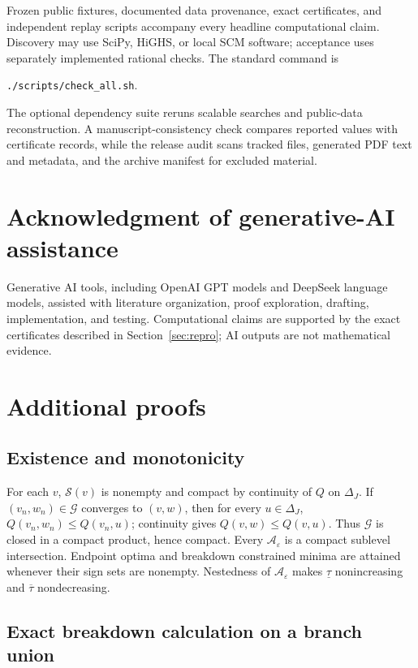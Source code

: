 \documentclass[10pt]{article}
\theoremstyle{definition}
\newcommand{\DeltaJ}{\Delta_J}
\newcommand{\cG}{\mathcal G}
\newcommand{\cA}{\mathcal A}
\newcommand{\cS}{\mathcal S}
\newcommand{\eps}{\varepsilon}
\newcommand{\code}[1]{\texttt{#1}}
\begin{document}
Frozen public fixtures, documented data provenance, exact certificates, and
independent replay scripts accompany every headline computational claim.  Discovery may
use SciPy, HiGHS, or local SCM software; acceptance uses separately implemented
rational checks.  The standard command is
\begin{center}
\code{./scripts/check\_all.sh}.
\end{center}
The optional dependency suite reruns scalable searches and public-data
reconstruction.  A manuscript-consistency check compares reported values with
certificate records, while the release audit scans tracked files, generated
PDF text and metadata, and the archive manifest for excluded material.

\section*{Acknowledgment of generative-AI assistance}

Generative AI tools, including OpenAI GPT models and DeepSeek language models,
assisted with literature organization, proof exploration, drafting, implementation,
and testing. Computational claims are supported by the
exact certificates described in Section~\ref{sec:repro}; AI outputs are not
mathematical evidence.

\appendix

\section{Additional proofs}

\subsection{Existence and monotonicity}

For each $v$, $\cS(v)$ is nonempty and compact by continuity of $Q$ on
$\DeltaJ$.  If $(v_n,w_n)\in\cG$ converges to $(v,w)$, then for every
$u\in\DeltaJ$, $Q(v_n,w_n)\le Q(v_n,u)$; continuity gives
$Q(v,w)\le Q(v,u)$.  Thus $\cG$ is closed in a compact product, hence compact.
Every $\cA_\eps$ is a compact sublevel intersection.  Endpoint optima and
breakdown constrained minima are attained whenever their sign sets are
nonempty.  Nestedness of $\cA_\eps$ makes $\underline\tau$ nonincreasing and
$\overline\tau$ nondecreasing.

\subsection{Exact breakdown calculation on a branch union}
\end{document}
